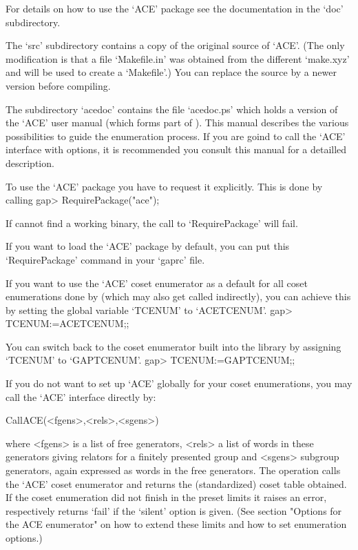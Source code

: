 For details on how to use the `ACE' package see the documentation in the
`doc' subdirectory.

The `src' subdirectory contains a copy of the original source of `ACE'. (The
only modification is that a file `Makefile.in' was obtained from the different
`make.xyz' and will be used to create a `Makefile'.)
You can replace the source by a newer version before compiling.

The subdirectory `acedoc' contains the file `acedoc.ps' which holds a
version of the `ACE' user manual (which forms part of \cite{aceman}). This
manual describes the various possibilities to guide the enumeration process.
If you are goind to call the `ACE' interface with options, it is recommended
you consult this manual for a detailled description.


To use the `ACE' package you have to request it explicitly. This is done by
calling 
\begintt
gap> RequirePackage("ace");
\endtt

If {\GAP} cannot find a working binary, the call to `RequirePackage' will
fail.

If you want to load the `ACE' package by default, you can put this
`RequirePackage' command in your `gaprc' file.

If you want to use the `ACE' coset enumerator as a default for all coset
enumerations done by {\GAP} (which may also get called indirectly), you can 
achieve this by setting the global variable `TCENUM' to `ACETCENUM'.
\begintt
gap> TCENUM:=ACETCENUM;;
\endtt

You
can switch back to the coset enumerator built into the {\GAP} library by
assigning `TCENUM' to `GAPTCENUM'.
\begintt
gap> TCENUM:=GAPTCENUM;;
\endtt



If you do not want to set up `ACE' globally for your coset enumerations,
you may call the `ACE' interface directly by:

\>CallACE(<fgens>,<rels>,<sgens>)

where <fgens> is a list of free generators, <rels> a list of words in these
generators giving relators for a finitely presented group and <sgens>
subgroup generators, again expressed as words in the free generators. The
operation calls the `ACE' coset enumerator and returns the (standardized)
coset table obtained. If the coset enumeration did not finish in the preset
limits it raises an error, respectively returns `fail' if the `silent'
option is given.
(See section "Options for the ACE enumerator" on how to extend these
limits and how to set enumeration options.)

